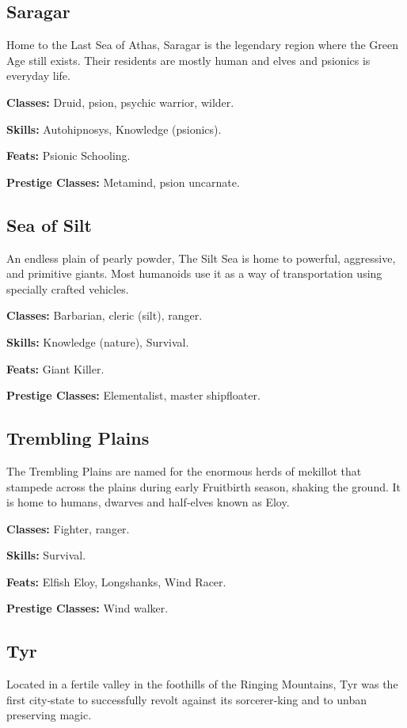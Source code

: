 \documentclass[10pt,a4paper,twocolumn]{d20}
\begin{document}
{\subsection{Saragar}
Home to the Last Sea of Athas, Saragar is the legendary region where the Green Age still exists. Their residents are mostly human and elves and psionics is everyday life.

\textbf{Classes:} Druid, psion, psychic warrior, wilder.

\textbf{Skills:} Autohipnosys, Knowledge (psionics).

\textbf{Feats:} Psionic Schooling.

\textbf{Prestige Classes:} Metamind, psion uncarnate.


\subsection{Sea of Silt}
An endless plain of pearly powder, The Silt Sea is home to powerful, aggressive, and primitive giants. Most humanoids use it as a way of transportation using specially crafted vehicles.

\textbf{Classes:} Barbarian, cleric (silt), ranger.

\textbf{Skills:} Knowledge (nature), Survival.

\textbf{Feats:} Giant Killer.

\textbf{Prestige Classes:} Elementalist, master shipfloater.


\subsection{Trembling Plains}
The Trembling Plains are named for the enormous herds of mekillot that stampede across the plains during early Fruitbirth season, shaking the ground. It is home to humans, dwarves and half‐elves known as Eloy.

\textbf{Classes:} Fighter, ranger.

\textbf{Skills:} Survival.

\textbf{Feats:} Elfish Eloy, Longshanks, Wind Racer.

\textbf{Prestige Classes:} Wind walker.


\subsection{Tyr}
Located in a fertile valley in the foothills of the Ringing Mountains, Tyr was the first city‐state to successfully revolt against its sorcerer‐king and to unban preserving magic.

}
\end{document}

